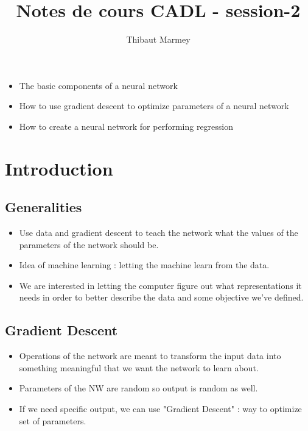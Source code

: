 \documentclass[12pt,a4paper]{article}
\author{Thibaut Marmey}
\title{Notes de cours CADL - session-2}
\begin{document}
	\maketitle

\begin{scriptsize} \begin{itemize}
\item The basic components of a neural network
\item How to use gradient descent to optimize parameters of a neural network
\item How to create a neural network for performing regression
\end{itemize}\end{scriptsize}

\begin{normalsize}
\tableofcontents
\end{normalsize}

\section{Introduction}
\subsection{Generalities}
\begin{itemize}
\item Use data and gradient descent to teach the network what the values of the parameters of the network should be.
\item Idea of machine learning : letting the machine learn from the data.
\item We are interested in letting the computer figure out what representations it needs in order to better describe the data and some objective we've defined.
\end{itemize}
\subsection{Gradient Descent}
\begin{itemize}
\item Operations of the network are meant to transform the input data into something meaningful that we want the network to learn about.
\item Parameters of the NW are random so output is random as well.
\item If we need specific output, we can use "Gradient Descent" : way to optimize set of parameters.
\end{itemize}
\end{document}
